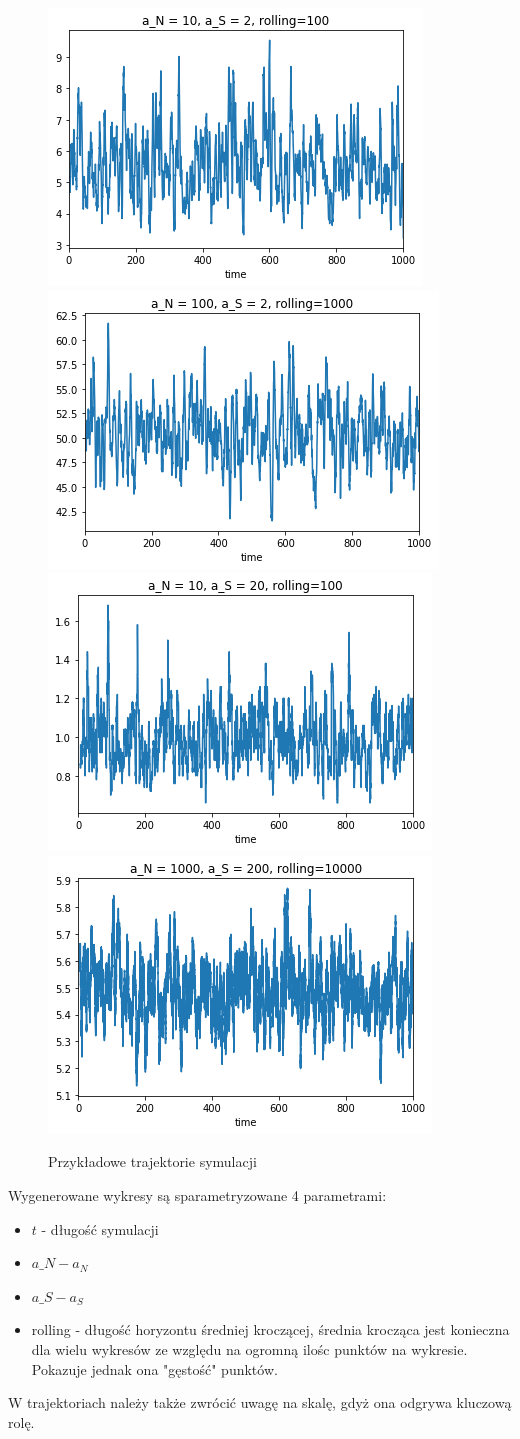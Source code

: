 \documentclass{article}
\begin{document}
\begin{figure}[h!]
\centering
\includegraphics[width=0.4\linewidth]{10,2}
\includegraphics[width=0.4\linewidth]{100,2}
\includegraphics[width=0.4\linewidth]{10,20}
\includegraphics[width=0.4\linewidth]{1000,200}
\caption{Przykładowe trajektorie symulacji}
\end{figure}
Wygenerowane wykresy są sparametryzowane 4 parametrami: \begin{itemize}
\item $t$ - długość symulacji
\item $a\_N - a_N$
\item $a\_S - a_S$
\item rolling - długość horyzontu średniej kroczącej, średnia krocząca jest konieczna dla wielu wykresów ze względu na ogromną ilośc punktów na wykresie. Pokazuje jednak ona "gęstość" punktów.
\end{itemize}
W trajektoriach należy także zwrócić uwagę na skalę, gdyż ona odgrywa kluczową rolę.
\end{document}
